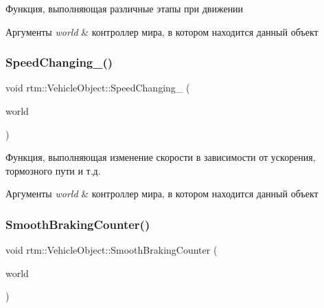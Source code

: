 Функция, выполняющая различные этапы при движении 


\begin{DoxyParams}{Аргументы}
{\em world} & контроллер мира, в котором находится данный объект \\
\hline
\end{DoxyParams}
\mbox{\label{classrtm_1_1_vehicle_object_aee8f792a78b9b1becf7a84c01157520b}} 
\subsubsection{\texorpdfstring{Speed\+Changing\+\_\+()}{SpeedChanging\_()}}
{\footnotesize\ttfamily void rtm\+::\+Vehicle\+Object\+::\+Speed\+Changing\+\_\+ (\begin{DoxyParamCaption}\item[{\hyperlink{classrtm_1_1_world_controller}{World\+Controller} $\ast$const}]{world }\end{DoxyParamCaption})\hspace{0.3cm}{\ttfamily [private]}}



Функция, выполняющая изменение скорости в зависимости от ускорения, тормозного пути и т.\+д. 


\begin{DoxyParams}{Аргументы}
{\em world} & контроллер мира, в котором находится данный объект \\
\hline
\end{DoxyParams}
\mbox{\label{classrtm_1_1_vehicle_object_a76d76e5138ecb2188bb678a361ca58d7}} 
\subsubsection{\texorpdfstring{Smooth\+Braking\+Counter()}{SmoothBrakingCounter()}}
{\footnotesize\ttfamily void rtm\+::\+Vehicle\+Object\+::\+Smooth\+Braking\+Counter (\begin{DoxyParamCaption}\item[{\hyperlink{classrtm_1_1_world_controller}{World\+Controller} $\ast$const}]{world }\end{DoxyParamCaption})\hspace{0.3cm}{\ttfamily [private]}}



